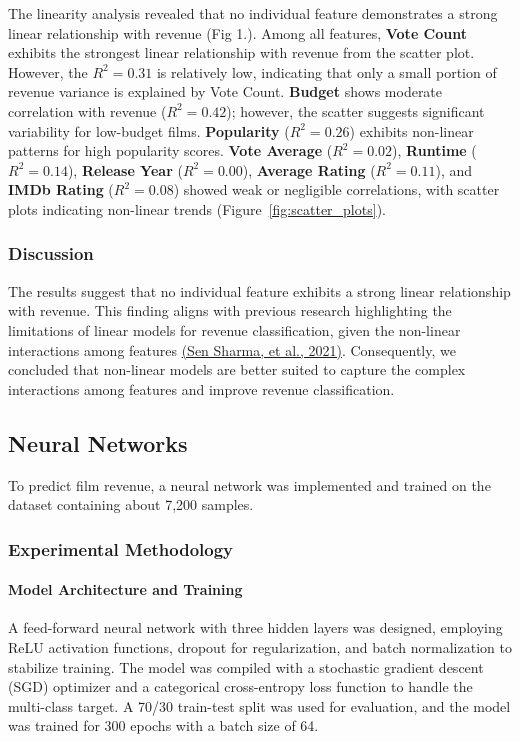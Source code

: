\documentclass{article}
\begin{document}
The linearity analysis revealed that no individual feature demonstrates a strong linear relationship with revenue (Fig 1.). Among all features, \textbf{Vote Count} exhibits the strongest linear relationship with revenue from the scatter plot. However, the \( R^2 = 0.31 \) is relatively low, indicating that only a small portion of revenue variance is explained by Vote Count. \textbf{Budget} shows moderate correlation with revenue (\( R^2 = 0.42 \)); however, the scatter suggests significant variability for low-budget films. \textbf{Popularity} (\( R^2 = 0.26 \)) exhibits non-linear patterns for high popularity scores. \textbf{Vote Average} (\( R^2 = 0.02 \)), \textbf{Runtime} (\( R^2 = 0.14 \)), \textbf{Release Year} (\( R^2 = 0.00 \)), \textbf{Average Rating} (\( R^2 = 0.11 \)), and \textbf{IMDb Rating} (\( R^2 = 0.08 \)) showed weak or negligible correlations, with scatter plots indicating non-linear trends (Figure~\ref{fig:scatter_plots}).

\subsubsection{Discussion}
The results suggest that no individual feature exhibits a strong linear relationship with revenue. This finding aligns with previous research highlighting the limitations of linear models for revenue classification, given the non-linear interactions among features \hyperref[SenSharma2021]{(Sen Sharma, et al., 2021)}. Consequently, we concluded that non-linear models are better suited to capture the complex interactions among features and improve revenue classification.

\subsection{Neural Networks}
To predict film revenue, a neural network was implemented and trained on the dataset containing about 7,200 samples. 

\subsubsection{Experimental Methodology}


\paragraph{Model Architecture and Training}
A feed-forward neural network with three hidden layers was designed, employing ReLU activation functions, dropout for regularization, and batch normalization to stabilize training. The model was compiled with a stochastic gradient descent (SGD) optimizer and a categorical cross-entropy loss function to handle the multi-class target. A 70/30 train-test split was used for evaluation, and the model was trained for 300 epochs with a batch size of 64.
\end{document}
